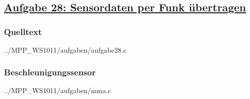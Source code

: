 \subsection
{\href{http://cst.mi.fu-berlin.de/intern/19606-P-MPP/Aufgaben/041102.html}
{Aufgabe 28: Sensordaten per Funk übertragen}}

\subsubsection*{Quelltext}


{../MPP_WS1011/aufgaben/aufgabe28.c}

\subsubsection*{Beschleunigungssensor}

%


{../MPP_WS1011/aufgaben/mma.c}

